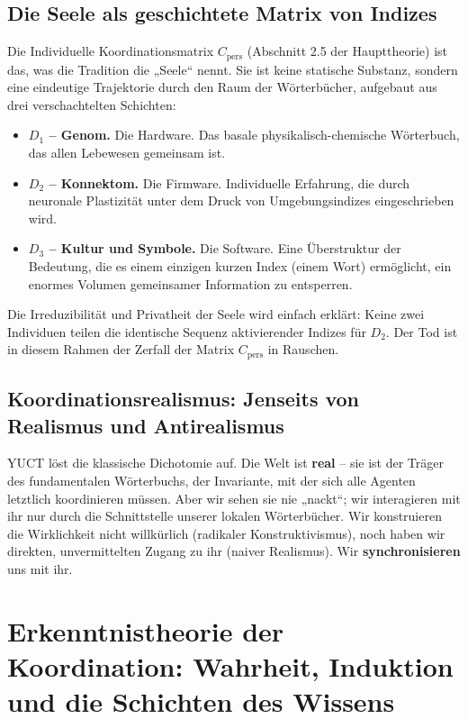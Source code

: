 \documentclass[12pt,a4paper]{article}
\begin{document}
	\subsection{Die Seele als geschichtete Matrix von Indizes}
	
	Die Individuelle Koordinationsmatrix \(C_{\mathrm{pers}}\) (Abschnitt 2.5 der Haupttheorie) ist das, was die Tradition die „Seele“ nennt. Sie ist keine statische Substanz, sondern eine eindeutige Trajektorie durch den Raum der Wörterbücher, aufgebaut aus drei verschachtelten Schichten:
	
	\begin{itemize}[leftmargin=*]
		\item \textbf{\(D_1\) – Genom.} Die Hardware. Das basale physikalisch-chemische Wörterbuch, das allen Lebewesen gemeinsam ist.
		\item \textbf{\(D_2\) – Konnektom.} Die Firmware. Individuelle Erfahrung, die durch neuronale Plastizität unter dem Druck von Umgebungsindizes eingeschrieben wird.
		\item \textbf{\(D_3\) – Kultur und Symbole.} Die Software. Eine Überstruktur der Bedeutung, die es einem einzigen kurzen Index (einem Wort) ermöglicht, ein enormes Volumen gemeinsamer Information zu entsperren.
	\end{itemize}
	
	Die Irreduzibilität und Privatheit der Seele wird einfach erklärt: Keine zwei Individuen teilen die identische Sequenz aktivierender Indizes für \(D_2\). Der Tod ist in diesem Rahmen der Zerfall der Matrix \(C_{\mathrm{pers}}\) in Rauschen.
	
	\subsection{Koordinationsrealismus: Jenseits von Realismus und Antirealismus}
	
	YUCT löst die klassische Dichotomie auf. Die Welt ist \textbf{real} – sie ist der Träger des fundamentalen Wörterbuchs, der Invariante, mit der sich alle Agenten letztlich koordinieren müssen. Aber wir sehen sie nie „nackt“; wir interagieren mit ihr nur durch die Schnittstelle unserer lokalen Wörterbücher. Wir konstruieren die Wirklichkeit nicht willkürlich (radikaler Konstruktivismus), noch haben wir direkten, unvermittelten Zugang zu ihr (naiver Realismus). Wir \textbf{synchronisieren} uns mit ihr.
	
	\section{Erkenntnistheorie der Koordination: Wahrheit, Induktion und die Schichten des Wissens}
	\label{sec:epistemology}
	
\end{document}
